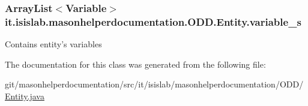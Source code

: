 \hypertarget{classit_1_1isislab_1_1masonhelperdocumentation_1_1_o_d_d_1_1_entity_a32a30da644c3d9ef1a3d04b6b5b8346f}{
\subsubsection[{variable\-\_\-s}]{\setlength{\rightskip}{0pt plus 5cm}Array\-List$<${\bf Variable}$>$ it.\-isislab.\-masonhelperdocumentation.\-O\-D\-D.\-Entity.\-variable\-\_\-s\hspace{0.3cm}{\ttfamily [private]}}}\label{classit_1_1isislab_1_1masonhelperdocumentation_1_1_o_d_d_1_1_entity_a32a30da644c3d9ef1a3d04b6b5b8346f}
Contains entity's variables 

The documentation for this class was generated from the following file\-:\begin{DoxyCompactItemize}
\item 
git/masonhelperdocumentation/src/it/isislab/masonhelperdocumentation/\-O\-D\-D/\hyperlink{_entity_8java}{Entity.\-java}\end{DoxyCompactItemize}
